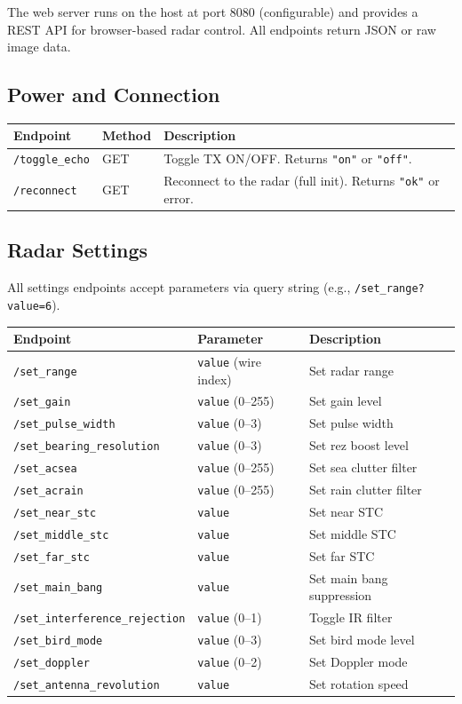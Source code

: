 \documentclass[11pt,letterpaper]{article}
\begin{document}
The web server runs on the host at port 8080 (configurable) and provides a REST API for browser-based radar control. All endpoints return JSON or raw image data.

\subsection{Power and Connection}

\begin{longtable}{@{}llp{7cm}@{}}
\toprule
\textbf{Endpoint} & \textbf{Method} & \textbf{Description} \\
\midrule
\endhead
\texttt{/toggle\_echo} & GET & Toggle TX ON/OFF. Returns \texttt{"on"} or \texttt{"off"}. \\
\texttt{/reconnect} & GET & Reconnect to the radar (full init). Returns \texttt{"ok"} or error. \\
\bottomrule
\end{longtable}

\subsection{Radar Settings}

All settings endpoints accept parameters via query string (e.g., \texttt{/set\_range?value=6}).

\begin{longtable}{@{}llp{7cm}@{}}
\toprule
\textbf{Endpoint} & \textbf{Parameter} & \textbf{Description} \\
\midrule
\endhead
\texttt{/set\_range} & \texttt{value} (wire index) & Set radar range \\
\texttt{/set\_gain} & \texttt{value} (0--255) & Set gain level \\
\texttt{/set\_pulse\_width} & \texttt{value} (0--3) & Set pulse width \\
\texttt{/set\_bearing\_resolution} & \texttt{value} (0--3) & Set rez boost level \\
\texttt{/set\_acsea} & \texttt{value} (0--255) & Set sea clutter filter \\
\texttt{/set\_acrain} & \texttt{value} (0--255) & Set rain clutter filter \\
\texttt{/set\_near\_stc} & \texttt{value} & Set near STC \\
\texttt{/set\_middle\_stc} & \texttt{value} & Set middle STC \\
\texttt{/set\_far\_stc} & \texttt{value} & Set far STC \\
\texttt{/set\_main\_bang} & \texttt{value} & Set main bang suppression \\
\texttt{/set\_interference\_rejection} & \texttt{value} (0--1) & Toggle IR filter \\
\texttt{/set\_bird\_mode} & \texttt{value} (0--3) & Set bird mode level \\
\texttt{/set\_doppler} & \texttt{value} (0--2) & Set Doppler mode \\
\texttt{/set\_antenna\_revolution} & \texttt{value} & Set rotation speed \\
\bottomrule
\end{longtable}
\end{document}
